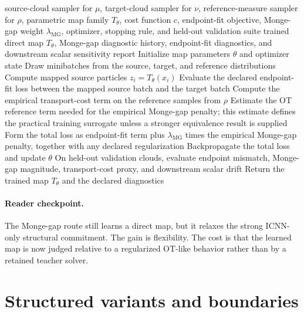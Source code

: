 \begin{algorithm}[ht]
\caption{\texttt{train\_monge\_gap\_regularized\_direct\_map}}
\begin{algorithmic}[1]
\Require source-cloud sampler for \(\mu\), target-cloud sampler for \(\nu\), reference-measure sampler for \(\rho\), parametric map family \(T_\theta\), cost function \(c\), endpoint-fit objective, Monge-gap weight \(\lambda_{\mathrm{MG}}\), optimizer, stopping rule, and held-out validation suite
\Ensure trained direct map \(T_\theta\), Monge-gap diagnostic history, endpoint-fit diagnostics, and downstream scalar sensitivity report
\State Initialize map parameters \(\theta\) and optimizer state
  \State Draw minibatches from the source, target, and reference distributions
  \State Compute mapped source particles \(z_i=T_\theta(x_i)\)
  \State Evaluate the declared endpoint-fit loss between the mapped source batch and the target batch
  \State Compute the empirical transport-cost term on the reference samples from \(\rho\)
  \State Estimate the OT reference term needed for the empirical Monge-gap penalty; this estimate defines the practical training surrogate unless a stronger equivalence result is supplied
  \State Form the total loss as endpoint-fit term plus \(\lambda_{\mathrm{MG}}\) times the empirical Monge-gap penalty, together with any declared regularization
  \State Backpropagate the total loss and update \(\theta\)
\EndWhile
  \State On held-out validation clouds, evaluate endpoint mismatch, Monge-gap magnitude, transport-cost proxy, and downstream scalar drift
  \State Return the trained map \(T_\theta\) and the declared diagnostics
\end{algorithmic}
\end{algorithm}

\paragraph{Reader checkpoint.}
The Monge-gap route still learns a direct map, but it relaxes the strong
ICNN-only structural commitment.  The gain is flexibility.  The cost is that
the learned map is now judged relative to a regularized OT-like behavior rather
than by a retained teacher solver.

\section{Structured variants and boundaries}
\label{sec:bf-neural-ot-direct-structured}


